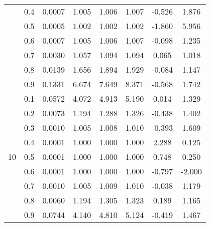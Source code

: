 \documentclass[11pt,a4paper]{report}
\begin{document}
\begin{longtable}{ | c | c || c | c | c | c | c | c | }
 & 0.4 & 0.0007 & 1.005 & 1.006 & 1.007 & -0.526 & 1.876 \\
 & 0.5 & 0.0005 & 1.002 & 1.002 & 1.002 & -1.860 & 5.956 \\
 & 0.6 & 0.0007 & 1.005 & 1.006 & 1.007 & -0.098 & 1.235 \\
 & 0.7 & 0.0030 & 1.057 & 1.094 & 1.094 & 0.065 & 1.018 \\
 & 0.8 & 0.0139 & 1.656 & 1.894 & 1.929 & -0.084 & 1.147 \\
 & 0.9 & 0.1331 & 6.674 & 7.649 & 8.371 & -0.568 & 1.742 \\
 \hline
\multirow{9}{*}{10} & 0.1 & 0.0572 & 4.072 & 4.913 & 5.190 & 0.014 & 1.329 \\
 & 0.2 & 0.0073 & 1.194 & 1.288 & 1.326 & -0.438 & 1.402 \\
 & 0.3 & 0.0010 & 1.005 & 1.008 & 1.010 & -0.393 & 1.609 \\
 & 0.4 & 0.0001 & 1.000 & 1.000 & 1.000 & 2.288 & 0.125 \\
 & 0.5 & 0.0001 & 1.000 & 1.000 & 1.000 & 0.748 & 0.250 \\
 & 0.6 & 0.0001 & 1.000 & 1.000 & 1.000 & -0.797 & -2.000 \\
 & 0.7 & 0.0010 & 1.005 & 1.009 & 1.010 & -0.038 & 1.179 \\
 & 0.8 & 0.0060 & 1.194 & 1.305 & 1.323 & 0.189 & 1.165 \\
 & 0.9 & 0.0744 & 4.140 & 4.810 & 5.124 & -0.419 & 1.467 \\
 \hline
\hline
\end{longtable}
\end{document}
